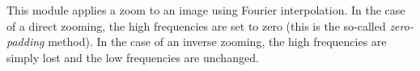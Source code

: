This module applies a zoom to an image using Fourier interpolation.
In the case of a direct zooming, the high frequencies are set to zero
(this is the so-called {\em zero-padding} method). In the case
of an inverse zooming, the high frequencies are simply lost and the
low frequencies are unchanged.